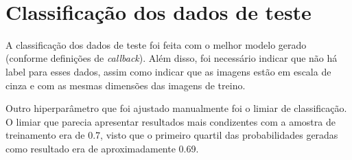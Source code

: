\documentclass[
  a4paperpaper,
]{article}
\newenvironment{Shaded}{\begin{snugshade}}{\end{snugshade}}
\newcommand{\AttributeTok}[1]{\textcolor[rgb]{0.40,0.45,0.13}{#1}}
\newcommand{\DecValTok}[1]{\textcolor[rgb]{0.68,0.00,0.00}{#1}}
\newcommand{\FunctionTok}[1]{\textcolor[rgb]{0.28,0.35,0.67}{#1}}
\newcommand{\NormalTok}[1]{\textcolor[rgb]{0.00,0.23,0.31}{#1}}
\newcommand{\OtherTok}[1]{\textcolor[rgb]{0.00,0.23,0.31}{#1}}
\newcommand{\SpecialCharTok}[1]{\textcolor[rgb]{0.37,0.37,0.37}{#1}}
\newcommand{\StringTok}[1]{\textcolor[rgb]{0.13,0.47,0.30}{#1}}
\begin{document}
\begin{Shaded}
\end{Shaded}

~

\section{Classificação dos dados de
teste}\label{classificauxe7uxe3o-dos-dados-de-teste}

A classificação dos dados de teste foi feita com o melhor modelo gerado
(conforme definições de \emph{callback}). Além disso, foi necessário
indicar que não há label para esses dados, assim como indicar que as
imagens estão em escala de cinza e com as mesmas dimensões das imagens
de treino.

Outro hiperparâmetro que foi ajustado manualmente foi o limiar de
classificação. O limiar que parecia apresentar resultados mais
condizentes com a amostra de treinamento era de 0.7, visto que o
primeiro quartil das probabilidades geradas como resultado era de
aproximadamente 0.69.
\end{document}
